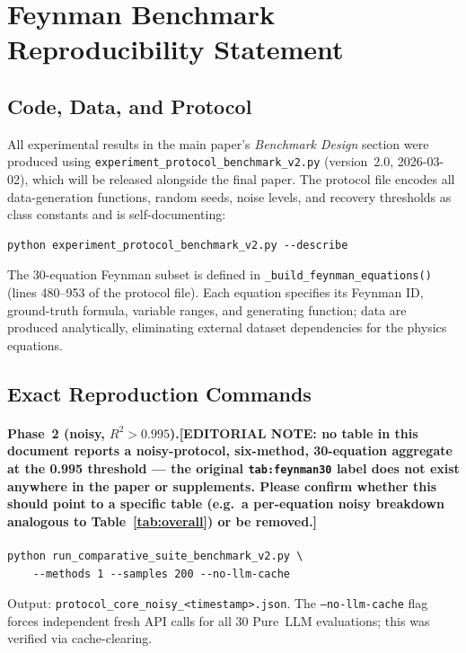 \documentclass[twoside,11pt]{article}
\begin{document}
\section{Feynman Benchmark Reproducibility Statement}
\label{app:repro_statement}

\subsection*{Code, Data, and Protocol}

All experimental results in the main paper's \emph{Benchmark Design} section were produced
using \texttt{experiment\_protocol\_benchmark\_v2.py} (version~2.0,
2026-03-02), which will be released alongside the final paper.
The protocol file encodes all data-generation functions, random seeds, noise
levels, and recovery thresholds as class constants and is self-documenting:

\begin{verbatim}
python experiment_protocol_benchmark_v2.py --describe
\end{verbatim}

\noindent The 30-equation Feynman subset is defined in
\texttt{\_build\_feynman\_equations()} (lines 480--953 of the protocol file).
Each equation specifies its Feynman ID, ground-truth formula, variable
ranges, and generating function; data are produced analytically, eliminating
external dataset dependencies for the physics equations.

\subsection*{Exact Reproduction Commands}

\paragraph{Phase~2 (noisy, $R^2>0.995$).\textbf{[EDITORIAL NOTE: no table in this
document reports a noisy-protocol, six-method, 30-equation aggregate at the
0.995 threshold --- the original \texttt{tab:feynman30} label does not exist
anywhere in the paper or supplements. Please confirm whether this should
point to a specific table (e.g.\ a per-equation noisy breakdown analogous to
Table~\ref{tab:overall}) or be removed.]}}
\begin{verbatim}
python run_comparative_suite_benchmark_v2.py \
    --methods 1 --samples 200 --no-llm-cache
\end{verbatim}
Output: \texttt{protocol\_core\_noisy\_<timestamp>.json}.
The \texttt{--no-llm-cache} flag forces independent fresh API calls for all
30 Pure~LLM evaluations; this was verified via cache-clearing.
\end{document}
